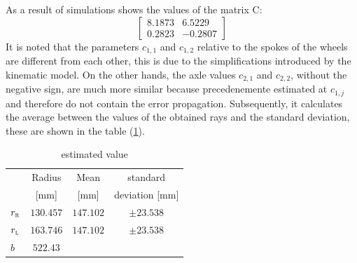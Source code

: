  As a result of simulations shows the values of the matrix C:
\begin{equation}
\label{eq:Cresult}
	\begin{bmatrix}
		8.1873  &  6.5229\\
    	0.2823 &  -0.2807
	\end{bmatrix}
\end{equation}
It is noted that the parameters $c_ {1,1}$ and $c_ {1,2}$ relative to the spokes of the wheels are different from each other, this is due to the simplifications introduced by the kinematic model. On the other hands, the axle values $c_ {2,1}$ and $c_ {2,2}$, without the negative sign, are much more similar because precedenemente estimated at $c_{1,j}$ and therefore do not contain the error propagation.
Subsequently, it calculates the average between the values of the obtained rays and the standard deviation, these are shown in the table (\ref{tab:recapvalue}).
\begin{table}[!h]
\centering
	\begin{tabular}{lccc}
		\hline
								& Radius 	& Mean 	& standard  \\
								&	[mm]	& [mm]	& deviation [mm]\\
		\hline
		$r_\textsc{r}$	&	$130.457$		& $147.102	$		&	$\pm23.538$\\
		$r_\textsc{l}$	&	$163.746$		& $147.102	$		&	$\pm23.538$\\
		$b$					&	$522.43$\\
		\hline
\end{tabular}
\caption{estimated value}
\label{tab:recapvalue}
\end{table}

